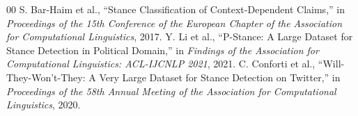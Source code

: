 \documentclass[conference]{IEEEtran}
\begin{document}
\begin{thebibliography}{00}
 S. Bar-Haim et al., ``Stance Classification of Context-Dependent Claims,'' in \textit{Proceedings of the 15th Conference of the European Chapter of the Association for Computational Linguistics}, 2017.
 Y. Li et al., ``P-Stance: A Large Dataset for Stance Detection in Political Domain,'' in \textit{Findings of the Association for Computational Linguistics: ACL-IJCNLP 2021}, 2021.
 C. Conforti et al., ``Will-They-Won't-They: A Very Large Dataset for Stance Detection on Twitter,'' in \textit{Proceedings of the 58th Annual Meeting of the Association for Computational Linguistics}, 2020.

\end{thebibliography}
\end{document}
